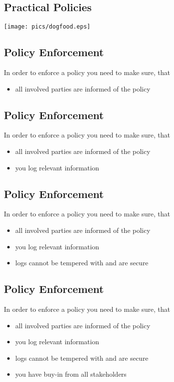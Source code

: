 \documentclass[xga]{xdvislides}
\begin{document}
\subsection{Practical Policies}
\begin{center}
	\texttt{[image: pics/dogfood.eps]}
\end{center}

\subsection{Policy Enforcement}
In order to enforce a policy you need to make sure, that
\begin{itemize}
	\item all involved parties are informed of the policy
\end{itemize}

\subsection{Policy Enforcement}
In order to enforce a policy you need to make sure, that
\begin{itemize}
	\item all involved parties are informed of the policy
	\item you log relevant information
\end{itemize}

\subsection{Policy Enforcement}
In order to enforce a policy you need to make sure, that
\begin{itemize}
	\item all involved parties are informed of the policy
	\item you log relevant information
	\item logs cannot be tempered with and are secure
\end{itemize}

\subsection{Policy Enforcement}
In order to enforce a policy you need to make sure, that
\begin{itemize}
	\item all involved parties are informed of the policy
	\item you log relevant information
	\item logs cannot be tempered with and are secure
	\item you have buy-in from all stakeholders
\end{itemize}
\end{document}
